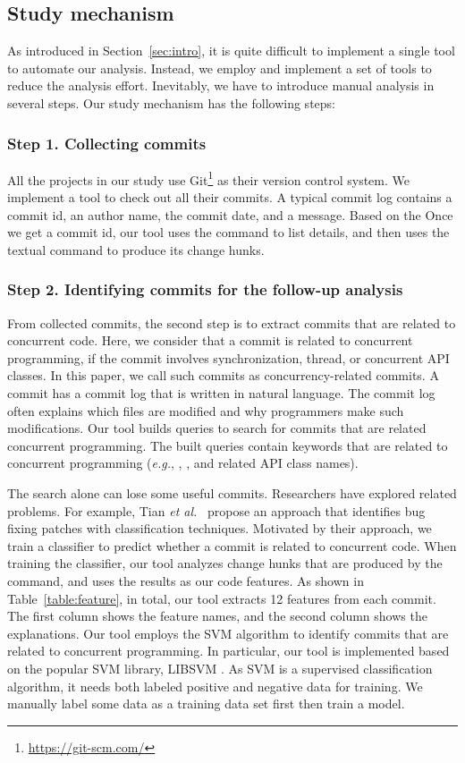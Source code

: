 \subsection{Study mechanism}
\label{sec:method:tool}
As introduced in Section~\ref{sec:intro}, it is quite difficult to implement a single tool to automate our analysis. Instead, we employ and implement a set of tools to reduce the analysis effort. Inevitably, we have to introduce manual analysis in several steps. Our study mechanism has the following steps:

\subsubsection{Step 1. Collecting commits} All the projects in our study use Git\footnote{\url{https://git-scm.com/}} as their version control system. We implement a tool to check out all their commits. A typical commit log contains a commit id, an author name, the commit date, and a message. Based on the Once we get a commit id, our tool uses the  command to list details, and then uses the textual  command to produce its change hunks.

\subsubsection{Step 2. Identifying commits for the follow-up analysis} From collected commits, the second step is to extract commits that are related to concurrent code. Here, we consider that a commit is related to concurrent programming, if the commit involves synchronization, thread, or concurrent API classes. In this paper, we call such commits as concurrency-related commits. A commit has a commit log that is written in natural language. The commit log often explains which files are modified and why programmers make such modifications. Our tool builds queries to search for commits that are related concurrent programming. The built queries contain keywords that are related to concurrent programming (\emph{e.g.}, , , and related API class names).

The search alone can lose some useful commits. Researchers have explored related problems. For example, Tian \emph{et al.}~\cite{tian2012identifying} propose an approach that identifies bug fixing patches with classification techniques. Motivated by their approach, we train a classifier to predict whether a commit is related to concurrent code. When training the classifier, our tool analyzes change hunks that are produced by the  command, and uses the results as our code features. As shown in Table~\ref{table:feature}, in total, our tool extracts 12 features from each commit. The first column shows the feature names, and the second column shows the explanations.
Our tool employs the SVM \cite{journals/ml/CortesV95} algorithm to identify commits that are related to concurrent programming. In particular, our tool is implemented based on the popular SVM library, LIBSVM \cite{libsvm}. As SVM is a supervised classification algorithm, it needs both labeled positive and negative data for training. We manually label some data as a training data set first then train a model.



